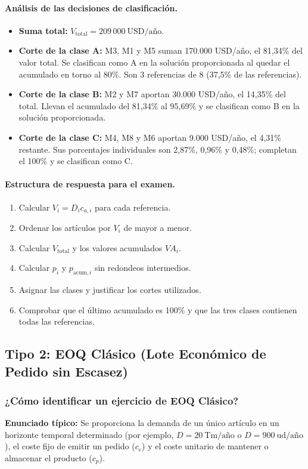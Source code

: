 \documentclass[11pt,a4paper]{article}
\begin{document}
\paragraph{Análisis de las decisiones de clasificación.}
\begin{itemize}
    \item \textbf{Suma total:} $V_{\text{total}} = 209\,000\ \text{USD/año}$.
    \item \textbf{Corte de la clase A:} M3, M1 y M5 suman 170.000 USD/año, el 81,34\% del valor total. Se clasifican como A en la solución proporcionada al quedar el acumulado en torno al 80\%. Son 3 referencias de 8 (37,5\% de las referencias).
    \item \textbf{Corte de la clase B:} M2 y M7 aportan 30.000 USD/año, el 14,35\% del total. Llevan el acumulado del 81,34\% al 95,69\% y se clasifican como B en la solución proporcionada.
    \item \textbf{Corte de la clase C:} M4, M8 y M6 aportan 9.000 USD/año, el 4,31\% restante. Sus porcentajes individuales son 2,87\%, 0,96\% y 0,48\%; completan el 100\% y se clasifican como C.
\end{itemize}

\paragraph{Estructura de respuesta para el examen.}
\begin{enumerate}
    \item Calcular $V_i = D_i c_{a,i}$ para cada referencia.
    \item Ordenar los artículos por $V_i$ de mayor a menor.
    \item Calcular $V_{\text{total}}$ y los valores acumulados $VA_i$.
    \item Calcular $p_i$ y $p_{\text{acum},i}$ sin redondeos intermedios.
    \item Asignar las clases y justificar los cortes utilizados.
    \item Comprobar que el último acumulado es 100\% y que las tres clases contienen todas las referencias.
\end{enumerate}


\clearpage
\subsection{Tipo 2: EOQ Clásico (Lote Económico de Pedido sin Escasez)}

\subsubsection{¿Cómo identificar un ejercicio de EOQ Clásico?}
\textbf{Enunciado típico:} Se proporciona la demanda de un único artículo en un horizonte temporal determinado (por ejemplo, $D=20\ \text{Tm/año}$ o $D=900\ \text{ud/año}$), el coste fijo de emitir un pedido ($c_e$) y el coste unitario de mantener o almacenar el producto ($c_p$).
\end{document}
